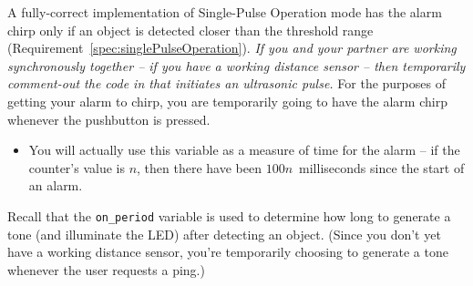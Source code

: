 A fully-correct implementation of Single-Pulse Operation mode has the alarm chirp only if an object is detected closer than the threshold range (Requirement~\ref{spec:singlePulseOperation}).
\textit{If you and your partner are working synchronously together -- if you have a working distance sensor -- then temporarily comment-out the code in  that initiates an ultrasonic pulse.}
For the purposes of getting your alarm to chirp, you are temporarily going to have the alarm chirp whenever the pushbutton is pressed.


\begin{description}
        \begin{itemize}
            \item You will actually use this variable as a measure of time for the alarm -- if the counter's value is $n$, then there have been $100n$~milliseconds since the start of an alarm.
        \end{itemize}
\end{description}

Recall that the \lstinline{on_period} variable is used to determine how long to generate a tone (and illuminate the LED) after detecting an object.
(Since you don't yet have a working distance sensor, you're temporarily choosing to generate a tone whenever the user requests a ping.)

